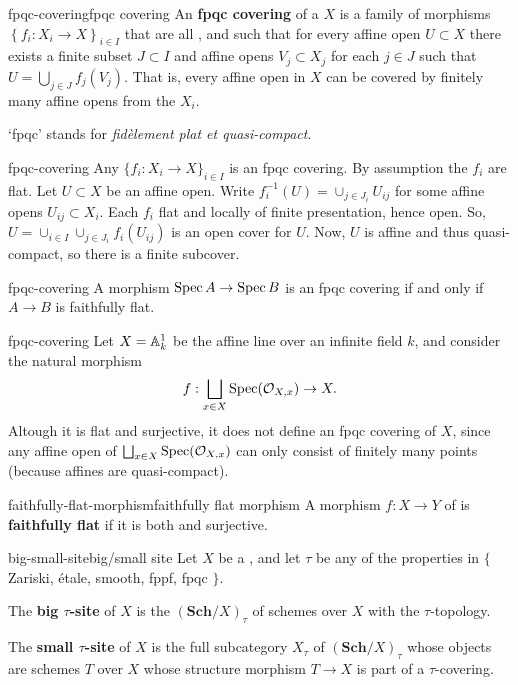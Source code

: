 \begin{topic}{fpqc-covering}{fpqc covering}
    An \textbf{fpqc covering} of a  $X$ is a family of morphisms $\left\{ f_i : X_i \to X \right\}_{i \in I}$ that are all , and such that for every affine open $U \subset X$ there exists a finite subset $J \subset I$ and affine opens $V_j \subset X_j$ for each $j \in J$ such that $U = \bigcup_{j \in J} f_j(V_j)$. That is, every affine open in $X$ can be covered by finitely many affine opens from the $X_i$.
    
    `fpqc' stands for \textit{fidèlement plat et quasi-compact}.
\end{topic}

\begin{example}{fpqc-covering}
    Any  $\{ f_i : X_i \to X \}_{i \in I}$ is an fpqc covering. By assumption the $f_i$ are flat. Let $U \subset X$ be an affine open. Write $f_i^{-1}(U) = \cup_{j \in J_i} U_{ij}$ for some affine opens $U_{ij} \subset X_i$. Each $f_i$ flat and locally of finite presentation, hence open. So, $U = \cup_{i \in I} \cup_{j \in J_i} f_i(U_{ij})$ is an open cover for $U$. Now, $U$ is affine and thus quasi-compact, so there is a finite subcover.
\end{example}

\begin{example}{fpqc-covering}
    A morphism $\Spec A \to \Spec B$ is an fpqc covering if and only if $A \to B$ is faithfully flat.
\end{example}

\begin{example}{fpqc-covering}
    Let $X = \AA^1_k$ be the affine line over an infinite field $k$, and consider the natural morphism
    \[ f : \bigsqcup_{x \in X} \Spec(\mathcal{O}_{X, x}) \to X . \]
    Altough it is flat and surjective, it does not define an fpqc covering of $X$, since any affine open of $\bigsqcup_{x \in X} \Spec(\mathcal{O}_{X, x})$ can only consist of finitely many points (because affines are quasi-compact).
\end{example}

\begin{topic}{faithfully-flat-morphism}{faithfully flat morphism}
    A morphism $f : X \to Y$ of  is \textbf{faithfully flat} if it is both  and surjective.
\end{topic}

\begin{topic}{big-small-site}{big/small site}
    Let $X$ be a , and let $\tau$ be any of the properties in $\{$ Zariski, étale, smooth, fppf, fpqc $\}$.
    
    The \textbf{big $\tau$-site} of $X$ is the  $(\textbf{Sch}/X)_\tau$ of schemes over $X$ with the $\tau$-topology.
    
    The \textbf{small $\tau$-site} of $X$ is the full subcategory $X_\tau$ of $(\textbf{Sch}/X)_\tau$ whose objects are schemes $T$ over $X$ whose structure morphism $T \to X$ is part of a $\tau$-covering.
\end{topic}

